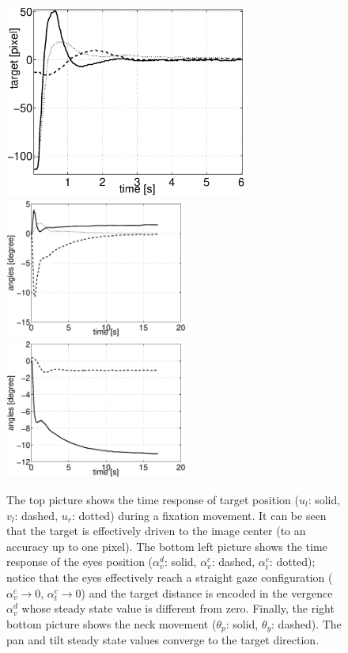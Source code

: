\begin{figure} [!ht]
\centering
\includegraphics[width=80mm]{Figure/TimeResponseImage.eps}\\ \includegraphics[width=60mm]{Figure/TimeResponseEyes.eps}
\includegraphics[width=60mm]{Figure/TimeResponseEyesNeck.eps}
\caption{The top picture shows the time response of target position 
($u_l$: solid, $v_l$: dashed, $u_r$: dotted) during a fixation movement. It can be seen 
	that the target is effectively driven to the image center (to an accuracy up to one pixel). The bottom left picture shows the time 
response of the eyes position ($\alpha_v^d$: solid, $\alpha_v^c$: dashed, 
$\alpha_t^c$: dotted); notice that the eyes 
effectively reach a straight gaze configuration ($\alpha_v^c 
\rightarrow 0$, $\alpha_t^c \rightarrow 0$) and the target distance is
encoded in the vergence $\alpha_v^d$ whose steady state value is different
from zero. Finally, the right bottom picture shows the neck movement ($\theta_p$: solid,
 $\theta_y$: dashed). The pan and tilt steady state 
values converge to the target direction.}
\label{Fig:TimeResponse}
\end{figure}
